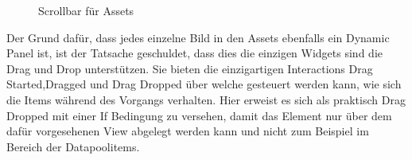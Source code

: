 \begin{figure}%
\centering
{}%
\qquad
{}%

\caption{Scrollbar für Assets}%
\label{fig:Prototyp_02}
\end{figure}

Der Grund dafür, dass jedes einzelne Bild in den Assets ebenfalls ein Dynamic Panel ist, ist der Tatsache geschuldet, dass dies die einzigen Widgets sind die Drag und Drop unterstützen.
Sie bieten die einzigartigen Interactions \glqq Drag Started\grqq{},\glqq Dragged\grqq{} und \glqq Drag Dropped\grqq{} über welche gesteuert werden kann, wie sich die Items während des Vorgangs verhalten.
Hier erweist es sich als praktisch \glqq Drag Dropped\grqq{} mit einer If Bedingung zu versehen, damit das Element nur über dem dafür vorgesehenen View abgelegt werden kann und nicht zum Beispiel im Bereich der Datapoolitems.


